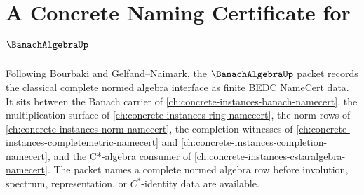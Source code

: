 \chapter{A Concrete Naming Certificate for $\BanachAlgebraUp$}
\label{ch:concrete-instances-banachalgebra-namecert}

Following Bourbaki and Gelfand--Naimark, the $\BanachAlgebraUp$ packet records the classical complete normed algebra interface as finite BEDC NameCert data. It sits between the Banach carrier of \autoref{ch:concrete-instances-banach-namecert}, the multiplication surface of \autoref{ch:concrete-instances-ring-namecert}, the norm rows of \autoref{ch:concrete-instances-norm-namecert}, the completion witnesses of \autoref{ch:concrete-instances-completemetric-namecert} and \autoref{ch:concrete-instances-completion-namecert}, and the C*-algebra consumer of \autoref{ch:concrete-instances-cstaralgebra-namecert}. The packet names a complete normed algebra row before involution, spectrum, representation, or $C^*$-identity data are available.

